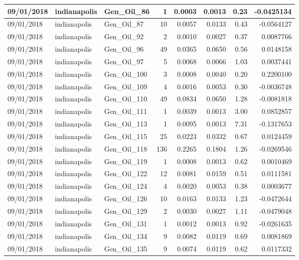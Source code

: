 \documentclass[
  letterpaper,
  DIV=11,
  numbers=noendperiod]{scrartcl}
\begin{document}
\begin{tabular}{l|l|l|r|r|r|r|r}
\hline
09/01/2018 & indianapolis & Gen\_Oil\_86 & 1 & 0.0003 & 0.0013 & 0.23 & -0.0425134\\
\hline
09/01/2018 & indianapolis & Gen\_Oil\_87 & 10 & 0.0057 & 0.0133 & 0.43 & -0.0564127\\
\hline
09/01/2018 & indianapolis & Gen\_Oil\_92 & 2 & 0.0010 & 0.0027 & 0.37 & 0.0087766\\
\hline
09/01/2018 & indianapolis & Gen\_Oil\_96 & 49 & 0.0365 & 0.0650 & 0.56 & 0.0148158\\
\hline
09/01/2018 & indianapolis & Gen\_Oil\_97 & 5 & 0.0068 & 0.0066 & 1.03 & 0.0037441\\
\hline
09/01/2018 & indianapolis & Gen\_Oil\_100 & 3 & 0.0008 & 0.0040 & 0.20 & 0.2200100\\
\hline
09/01/2018 & indianapolis & Gen\_Oil\_109 & 4 & 0.0016 & 0.0053 & 0.30 & -0.0036748\\
\hline
09/01/2018 & indianapolis & Gen\_Oil\_110 & 49 & 0.0834 & 0.0650 & 1.28 & -0.0081818\\
\hline
09/01/2018 & indianapolis & Gen\_Oil\_111 & 1 & 0.0039 & 0.0013 & 3.00 & 0.0852857\\
\hline
09/01/2018 & indianapolis & Gen\_Oil\_113 & 1 & 0.0095 & 0.0013 & 7.31 & -0.1317653\\
\hline
09/01/2018 & indianapolis & Gen\_Oil\_115 & 25 & 0.0223 & 0.0332 & 0.67 & 0.0124459\\
\hline
09/01/2018 & indianapolis & Gen\_Oil\_118 & 136 & 0.2265 & 0.1804 & 1.26 & -0.0269546\\
\hline
09/01/2018 & indianapolis & Gen\_Oil\_119 & 1 & 0.0008 & 0.0013 & 0.62 & 0.0010469\\
\hline
09/01/2018 & indianapolis & Gen\_Oil\_122 & 12 & 0.0081 & 0.0159 & 0.51 & 0.0111581\\
\hline
09/01/2018 & indianapolis & Gen\_Oil\_124 & 4 & 0.0020 & 0.0053 & 0.38 & 0.0003677\\
\hline
09/01/2018 & indianapolis & Gen\_Oil\_126 & 10 & 0.0163 & 0.0133 & 1.23 & -0.0472644\\
\hline
09/01/2018 & indianapolis & Gen\_Oil\_129 & 2 & 0.0030 & 0.0027 & 1.11 & -0.0479048\\
\hline
09/01/2018 & indianapolis & Gen\_Oil\_131 & 1 & 0.0012 & 0.0013 & 0.92 & -0.0261635\\
\hline
09/01/2018 & indianapolis & Gen\_Oil\_134 & 9 & 0.0082 & 0.0119 & 0.69 & 0.0081869\\
\hline
09/01/2018 & indianapolis & Gen\_Oil\_135 & 9 & 0.0074 & 0.0119 & 0.62 & 0.0117332\\

\end{tabular}
\end{document}
